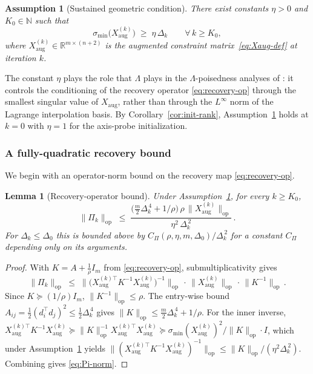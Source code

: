 \documentclass[11pt,a4paper]{article}
\newtheorem{lemma}[theorem]{Lemma}
\newtheorem{assumption}[theorem]{Assumption}
\begin{document}
\begin{assumption}[Sustained geometric condition]
\label{ass:geometry}
There exist constants $\eta>0$ and $K_0\in\mathbb{N}$ such that
\begin{equation}\label{eq:geom-cond}
  \sigma_{\min}\!\bigl(X_{\mathrm{aug}}^{(k)}\bigr)
  \;\ge\;\eta\,\Delta_k
  \qquad\forall\,k\ge K_0,
\end{equation}
where $X_{\mathrm{aug}}^{(k)}\in\mathbb{R}^{m\times(n+2)}$ is
the augmented constraint matrix~\eqref{eq:Xaug-def} at iteration
$k$.
\end{assumption}

The constant $\eta$ plays the role that $\Lambda$ plays in the
$\Lambda$-poisedness analyses of
\cite{ConnScheinbergVicente2009SIOPT}: it controls the
conditioning of the recovery operator
\eqref{eq:recovery-op} through the smallest singular value of
$X_{\mathrm{aug}}$, rather than through the $L^\infty$ norm of
the Lagrange interpolation basis. By
Corollary~\ref{cor:init-rank},
Assumption~\ref{ass:geometry} holds at $k=0$ with $\eta=1$ for
the axis-probe initialization.

\subsubsection*{A fully-quadratic recovery bound}

We begin with an operator-norm bound on the recovery map
\eqref{eq:recovery-op}.

\begin{lemma}[Recovery-operator bound]
\label{lem:Pi-bound}
Under Assumption~\ref{ass:geometry}, for every $k\ge K_0$,
\begin{equation}\label{eq:Pi-norm}
  \|\Pi_k\|_{\mathrm{op}}
  \;\le\;
  \frac{\bigl(\tfrac{m}{2}\Delta_k^{\,4}+1/\rho\bigr)\,\rho\,
        \|X_{\mathrm{aug}}^{(k)}\|_{\mathrm{op}}}{\eta^2\,\Delta_k^{\,2}}\,.
\end{equation}
For $\Delta_k\le\Delta_0$ this is bounded above by
$C_\Pi(\rho,\eta,m,\Delta_0)/\Delta_k^{\,2}$ for a constant
$C_\Pi$ depending only on its arguments.
\end{lemma}

\begin{proof}
With $K=A+\tfrac{1}{\rho}I_m$ from \eqref{eq:recovery-op},
submultiplicativity gives
\[
  \|\Pi_k\|_{\mathrm{op}}
  \;\le\;
  \bigl\|\bigl(X_{\mathrm{aug}}^{(k)\top}K^{-1}X_{\mathrm{aug}}^{(k)}\bigr)^{-1}\bigr\|_{\mathrm{op}}\,
  \cdot\,\|X_{\mathrm{aug}}^{(k)}\|_{\mathrm{op}}\,
  \cdot\,\|K^{-1}\|_{\mathrm{op}}\,.
\]
Since $K\succeq(1/\rho)I_m$, $\|K^{-1}\|_{\mathrm{op}}\le\rho$.
The entry-wise bound
$A_{ij}=\tfrac{1}{2}(d_i^{\!\top}d_j)^2\le\tfrac{1}{2}\Delta_k^{\,4}$
gives
$\|K\|_{\mathrm{op}}\le\tfrac{m}{2}\Delta_k^{\,4}+1/\rho$. For
the inner inverse,
$X_{\mathrm{aug}}^{(k)\top}K^{-1}X_{\mathrm{aug}}^{(k)}
\succeq\|K\|_{\mathrm{op}}^{-1}X_{\mathrm{aug}}^{(k)\top}X_{\mathrm{aug}}^{(k)}
\succeq\sigma_{\min}(X_{\mathrm{aug}}^{(k)})^2/\|K\|_{\mathrm{op}}\cdot I$,
which under Assumption~\ref{ass:geometry} yields
$\|(X_{\mathrm{aug}}^{(k)\top}K^{-1}X_{\mathrm{aug}}^{(k)})^{-1}\|_{\mathrm{op}}
\le\|K\|_{\mathrm{op}}/(\eta^2\Delta_k^{\,2})$. Combining gives
\eqref{eq:Pi-norm}.
\end{proof}
\end{document}
